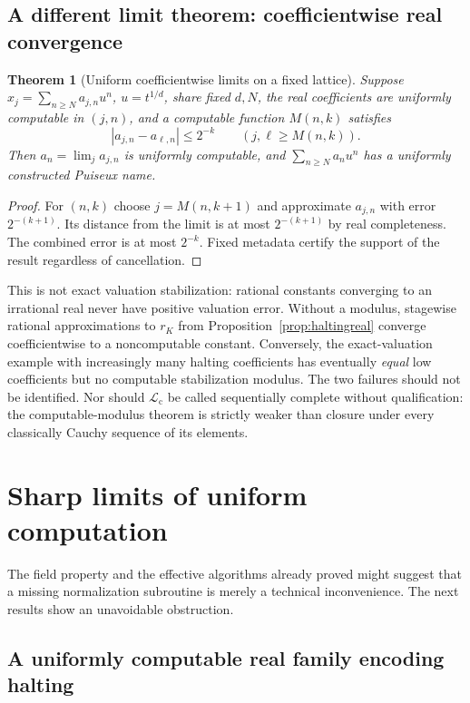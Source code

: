 \documentclass[11pt,letterpaper]{article}
\numberwithin{equation}{section}
\newtheorem{theorem}{Theorem}[section]
\theoremstyle{definition}
\theoremstyle{remark}
\newcommand{\Lc}{\mathcal L_{\mathrm c}}
\begin{document}
\subsection{A different limit theorem: coefficientwise real convergence}
\begin{theorem}[Uniform coefficientwise limits on a fixed lattice]
\label{thm:coefficient-limit}
Suppose $x_j=\sum_{n\ge N}a_{j,n}u^n$, $u=t^{1/d}$, share fixed $d,N$,
the real coefficients are uniformly computable in $(j,n)$, and a computable
function $M(n,k)$ satisfies
\[
 |a_{j,n}-a_{\ell,n}|\le 2^{-k}\qquad(j,\ell\ge M(n,k)).
\]
Then $a_n=\lim_j a_{j,n}$ is uniformly computable, and
$\sum_{n\ge N}a_nu^n$ has a uniformly constructed Puiseux name.
\end{theorem}
\begin{proof}
For $(n,k)$ choose $j=M(n,k+1)$ and approximate $a_{j,n}$ with error
$2^{-(k+1)}$. Its distance from the limit is at most $2^{-(k+1)}$ by real
completeness. The combined error is at most $2^{-k}$. Fixed metadata certify
the support of the result regardless of cancellation.
\end{proof}
This is not exact valuation stabilization: rational constants converging to
an irrational real never have positive valuation error. Without a modulus,
stagewise rational approximations to $r_K$ from
Proposition~\ref{prop:haltingreal} converge coefficientwise to a noncomputable
constant. Conversely, the exact-valuation example with increasingly many
halting coefficients has eventually \emph{equal} low coefficients but no
computable stabilization modulus. The two failures should not be identified.
Nor should $\Lc$ be called sequentially complete without qualification: the
computable-modulus theorem is strictly weaker than closure under every
classically Cauchy sequence of its elements.

\section{Sharp limits of uniform computation}
\label{sec:uniformlimits}

The field property and the effective algorithms already proved might suggest
that a missing normalization subroutine is merely a technical inconvenience.
The next results show an unavoidable obstruction.

\subsection{A uniformly computable real family encoding halting}
\end{document}
